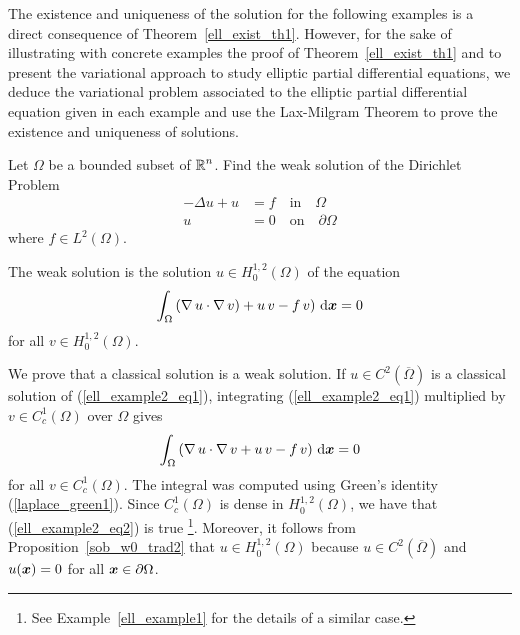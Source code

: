 The existence and uniqueness of the solution for the following
examples is a direct consequence of Theorem~\ref{ell_exist_th1}.
However, for the sake of illustrating with concrete examples the proof
of Theorem~\ref{ell_exist_th1} and to present the variational approach
to study elliptic partial differential equations, we deduce the
variational problem associated to the elliptic partial differential
equation given in each example and use the Lax-Milgram Theorem to
prove the existence and uniqueness of solutions.

\begin{egg}
Let $\Omega$ be a bounded subset of $\displaystyle \mathbb{R}^n$.  Find the
weak solution of the Dirichlet Problem
\begin{equation} \label{ell_example2_eq1}
\begin{split}
-\Delta u + u &= f \quad \text{in} \quad \Omega \\
u&= 0 \quad \text{on} \quad \partial \Omega
\end{split}
\end{equation}
where $\displaystyle f \in L^2(\Omega)$.       \label{ell_example2}

The weak solution is the solution $\displaystyle u\in H^{1,2}_0(\Omega)$ of the
equation
\begin{equation} \label{ell_example2_eq2}
\int_\Omega \left( \operatorname{\nabla} u \cdot \operatorname{\nabla} v) + u\, v - f\, v \right)
\,\mathrm{d}{{\bm{x}}} = 0
\end{equation}
for all $\displaystyle v \in H^{1,2}_0(\Omega)$.

We prove that a classical solution is a weak solution.  If
$\displaystyle u\in C^2(\overline{\Omega})$ is a classical solution of
(\ref{ell_example2_eq1}), integrating (\ref{ell_example2_eq1})
multiplied by $\displaystyle v \in C^1_c(\Omega)$ over $\Omega$ gives
\[
\int_\Omega \left( \operatorname{\nabla} u \cdot \operatorname{\nabla} v
+ u\, v - f\, v \right) \,\mathrm{d}{{\bm{x}}} = 0
\]
for all $\displaystyle v \in C^1_c(\Omega)$.
The integral was computed using Green's identity (\ref{laplace_green1}).
Since $\displaystyle C^1_c(\Omega)$ is dense in
$\displaystyle H^{1,2}_0(\Omega)$, we have that
(\ref{ell_example2_eq2}) is true \footnote{See Example~\ref{ell_example1}
for the details of a similar case.}.
Moreover, it follows from Proposition~\ref{sob_w0_trad2} that
$\displaystyle u\in H^{1,2}_0(\Omega)$ because
$\displaystyle u\in C^2(\overline{\Omega})$ and $u({\bm{x}})=0$ for all
${\bm{x}} \in \partial \Omega$.


\end{egg}
